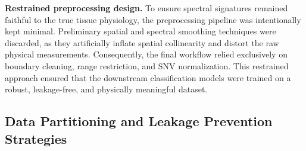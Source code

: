 
\medskip\noindent
\textbf{Restrained preprocessing design.}
To ensure spectral signatures remained faithful to the true tissue physiology, the preprocessing pipeline was intentionally kept minimal. Preliminary spatial and spectral smoothing techniques were discarded, as they artificially inflate spatial collinearity and distort the raw physical measurements. Consequently, the final workflow relied exclusively on boundary cleaning, range restriction, and SNV normalization. This restrained approach ensured that the downstream classification models were trained on a robust, leakage-free, and physically meaningful dataset.




\subsection{Data Partitioning and Leakage Prevention Strategies}
\label{subsec:leakage_control}

